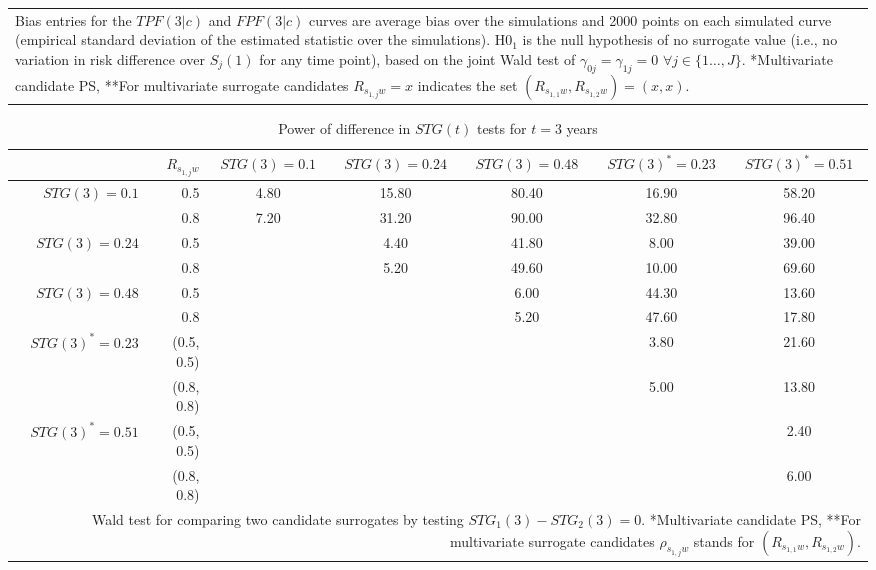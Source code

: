 \documentclass[times, doublespace]{simauth}
\begin{document}
\begin{table}
\begin{center}
\begin{tabular}{lccccccc}
\multicolumn{8}{p{9in}}{Bias entries for the $TPF(3|c)$ and $FPF(3|c)$ curves are average bias over the simulations and 2000 points on each simulated curve (empirical standard deviation of the estimated statistic over the simulations). H0$_1$ is the null hypothesis of no surrogate value (i.e., no variation in risk difference over $S_j(1)$ for any time point), based on the joint Wald test of $\gamma_{0j}=\gamma_{1j}=0$ $\forall j\in\{1\ldots,J\}$. *Multivariate candidate PS, **For multivariate surrogate candidates $R_{s_{1,j}w}=x$ indicates the set $(R_{s_{1,1}w},R_{s_{1,2}w})=(x,x)$.}
\end{tabular}
\end{center}
\end{table}

\begin{table}
\begin{center}
\caption{Power of difference in $STG(t)$ tests for $t=3$ years \label{Power}}
\begin{tabular}{rrccccc}
  \hline
 & $R_{s_{1,j}w}$ & $STG(3)=0.1$  & $STG(3)=0.24$  & $STG(3)=0.48$& $STG(3)^{*}=0.23$  & $STG(3)^{*}=0.51$\\
  \hline
$STG(3)=0.1$ &0.5 & 4.80 & 15.80 & 80.40 & 16.90 & 58.20 \\ 
   &0.8 &7.20 & 31.20 & 90.00 & 32.80 & 96.40 \\ 
$STG(3)=0.24$ &0.5&  & 4.40 & 41.80 & 8.00 & 39.00 \\ 
   &0.8 &  & 5.20 & 49.60 & 10.00 & 69.60 \\ 
$STG(3)=0.48$&0.5 &  &  & 6.00 & 44.30 & 13.60 \\ 
   &0.8&  &  & 5.20 & 47.60 & 17.80 \\ 
$STG(3)^{*}=0.23$&(0.5, 0.5) &  &  &  & 3.80 & 21.60 \\ 
   &(0.8, 0.8) &  &  &  & 5.00 & 13.80 \\ 
$STG(3)^{*}=0.51$&(0.5, 0.5)&   &  &  &  & 2.40 \\ 
   &(0.8, 0.8)&  &  &  &  & 6.00 \\ 
   \hline
\multicolumn{7}{p{9in}}{Wald test for comparing two candidate surrogates by testing $STG_1(3)-STG_2(3)=0$. *Multivariate candidate PS, **For multivariate surrogate candidates $\rho_{s_{1,j}w}$ stands for $(R_{s_{1,1}w},R_{s_{1,2}w})$.}
\end{tabular}
\end{center}
\end{table}
\end{document}
